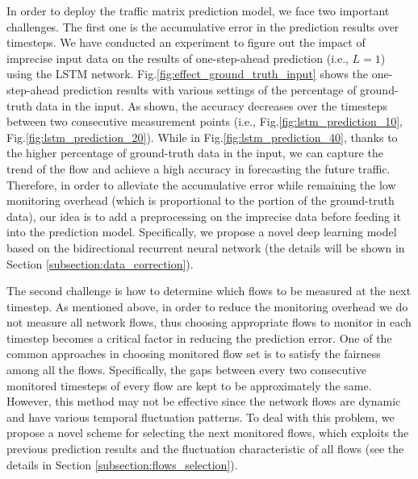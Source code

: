 In order to deploy the traffic matrix prediction model, we face two important challenges. The first one is the accumulative error in the prediction results over timesteps. We have conducted an experiment to figure out the impact of imprecise input data on the results of one-step-ahead prediction (i.e., $L=1$) using the LSTM network. 
Fig.\ref{fig:effect_ground_truth_input} shows the one-step-ahead prediction results with various settings of the percentage of ground-truth data in the input. As shown, the accuracy decreases over the timesteps between two consecutive measurement points (i.e., Fig.\ref{fig:lstm_prediction_10}, Fig.\ref{fig:lstm_prediction_20}). While in Fig.\ref{fig:lstm_prediction_40}, thanks to the higher percentage of ground-truth data in the input, we can capture the trend of the flow and achieve a high accuracy in forecasting the future traffic. Therefore, in order to alleviate the accumulative error while remaining the low monitoring overhead (which is proportional to the portion of the ground-truth data), our idea is to add a preprocessing on the imprecise data before feeding it into the prediction model. Specifically, we propose a novel deep learning model based on the bidirectional recurrent neural network (the details will be shown in Section \ref{subsection:data_correction}).

The second challenge is how to determine which flows to be measured at the next timestep. As mentioned above, in order to reduce the monitoring overhead we do not measure all network flows, thus choosing appropriate flows to monitor in each timestep becomes a critical factor in reducing the prediction error. One of the common approaches in choosing monitored flow set is to satisfy the fairness among all the flows. Specifically, the gaps between every two consecutive monitored timesteps of every flow are kept to be approximately the same. However, this method may not be effective since the network flows are dynamic and have various temporal fluctuation patterns. To deal with this problem, we propose a novel scheme for selecting the next monitored flows, which exploits the previous prediction results and the fluctuation characteristic of all flows (see the details in Section \ref{subsection:flows_selection}).
